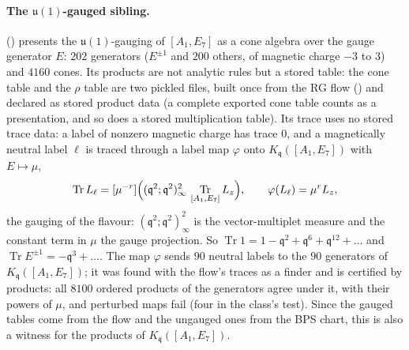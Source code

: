 \documentclass[11pt]{amsart}
\DeclareMathOperator{\Tr}{Tr}
\newcommand\fq{\mathfrak{q}}
\theoremstyle{remark}
\begin{document}
\paragraph{The $\mathfrak u(1)$-gauged sibling.}  
() presents the $\mathfrak
u(1)$-gauging of $[A_1,E_7]$ as a cone algebra over the gauge generator $E$:
$202$ generators ($E^{\pm1}$ and $200$ others, of magnetic charge $-3$ to $3$)
and $4160$ cones.  Its products are not analytic rules but a stored table: the
cone table and the $\rho$ table are two pickled files, built once from the RG
flow  () and
declared as stored product data (a complete exported cone table counts as a presentation, and so does a
stored multiplication table).
Its trace uses no stored trace data: a label of nonzero magnetic charge has trace $0$, and
a magnetically neutral label $\ell$ is traced through a label map $\varphi$ onto
$K_\fq([A_1,E_7])$ with $E\mapsto\mu$,
\begin{equation}\label{eq:comp-e7-gauged}
  \Tr L_\ell=[\mu^{-r}]\Bigl((\fq^2;\fq^2)_\infty^2\,\Tr_{[A_1,E_7]}L_z\Bigr),
  \qquad \varphi(L_\ell)=\mu^rL_z ,
\end{equation}
the gauging of the flavour: $(\fq^2;\fq^2)_\infty^2$ is the vector-multiplet
measure and the constant term in $\mu$ the gauge projection.  So
$\Tr1=1-\fq^2+\fq^6+\fq^{12}+\dots$ and $\Tr E^{\pm1}=-\fq^3+\dots$.  The map
$\varphi$ sends $90$ neutral labels to the $90$ generators of $K_\fq([A_1,E_7])$;
it was found with the flow's traces as a finder and is certified by products:
all $8100$ ordered products of the generators agree under it, with their powers
of $\mu$, and perturbed maps fail (four in the class's test).  Since the gauged
tables come from the flow and the ungauged ones from the BPS chart, this is also
a witness for the products of $K_\fq([A_1,E_7])$.
\end{document}
